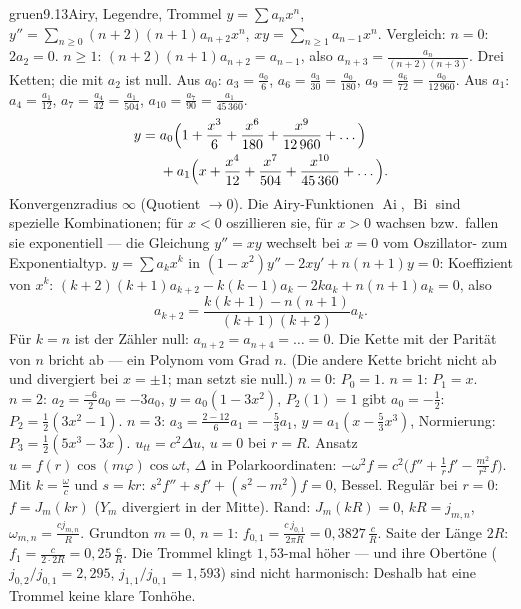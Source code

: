 \begin{loesungkarte}{gruen}{9.13}{Airy, Legendre, Trommel}
$y = \sum a_nx^{n}$, $y'' = \sum_{n\ge0}(n + 2)(n + 1)a_{n+2}x^{n}$, $xy = \sum_{n\ge1}a_{n-1}x^{n}$. Vergleich: $n = 0$: $2a_2 = 0$. $n\ge1$: $(n + 2)(n + 1)a_{n+2} = a_{n-1}$, also $a_{n+3} = \frac{a_n}{(n + 2)(n + 3)}$. Drei Ketten; die mit $a_2$ ist null. Aus $a_0$: $a_3 = \frac{a_0}6$, $a_6 = \frac{a_3}{30} = \frac{a_0}{180}$, $a_9 = \frac{a_6}{72} = \frac{a_0}{12\,960}$. Aus $a_1$: $a_4 = \frac{a_1}{12}$, $a_7 = \frac{a_4}{42} = \frac{a_1}{504}$, $a_{10} = \frac{a_7}{90} = \frac{a_1}{45\,360}$.
\begin{align*} y = {}& a_0\Bigl(1 + \frac{x^{3}}6 + \frac{x^{6}}{180} + \frac{x^{9}}{12\,960} + \dots\Bigr)\\ &+ a_1\Bigl(x + \frac{x^{4}}{12} + \frac{x^{7}}{504} + \frac{x^{10}}{45\,360} + \dots\Bigr). \end{align*}
Konvergenzradius $\infty$ (Quotient $\to0$). Die Airy-Funktionen $\operatorname{Ai}$, $\operatorname{Bi}$ sind spezielle Kombinationen; für $x < 0$ oszillieren sie, für $x > 0$ wachsen bzw.\ fallen sie exponentiell --- die Gleichung $y'' = xy$ wechselt bei $x = 0$ vom Oszillator- zum Exponentialtyp.
$y = \sum a_kx^{k}$ in $(1 - x^{2})y'' - 2xy' + n(n + 1)y = 0$: Koeffizient von $x^{k}$: $(k + 2)(k + 1)a_{k+2} - k(k - 1)a_k - 2ka_k + n(n + 1)a_k = 0$, also
\[ a_{k+2} = \frac{k(k + 1) - n(n + 1)}{(k + 1)(k + 2)}a_k. \]
Für $k = n$ ist der Zähler null: $a_{n+2} = a_{n+4} = \dots = 0$. Die Kette mit der Parität von $n$ bricht ab --- ein Polynom vom Grad $n$. (Die andere Kette bricht nicht ab und divergiert bei $x = \pm1$; man setzt sie null.) $n = 0$: $P_0 = 1$. $n = 1$: $P_1 = x$. $n = 2$: $a_2 = \frac{-6}2a_0 = -3a_0$, $y = a_0(1 - 3x^{2})$, $P_2(1) = 1$ gibt $a_0 = -\frac12$: $P_2 = \frac12(3x^{2} - 1)$. $n = 3$: $a_3 = \frac{2 - 12}6a_1 = -\frac53a_1$, $y = a_1(x - \frac53x^{3})$, Normierung: $P_3 = \frac12(5x^{3} - 3x)$.
$u_{tt} = c^{2}\Delta u$, $u = 0$ bei $r = R$. Ansatz $u = f(r)\cos(m\varphi)\cos\omega t$, $\Delta$ in Polarkoordinaten: $-\omega^{2}f = c^{2}\bigl(f'' + \frac1rf' - \frac{m^{2}}{r^{2}}f\bigr)$. Mit $k = \frac\omega c$ und $s = kr$: $s^{2}f'' + sf' + (s^{2} - m^{2})f = 0$, Bessel. Regulär bei $r = 0$: $f = J_m(kr)$ ($Y_m$ divergiert in der Mitte). Rand: $J_m(kR) = 0$, $kR = j_{m,n}$, $\omega_{m,n} = \frac{cj_{m,n}}R$. Grundton $m = 0$, $n = 1$: $f_{0,1} = \frac{c\,j_{0,1}}{2\pi R} = 0{,}3827\,\frac cR$. Saite der Länge $2R$: $f_1 = \frac c{2\cdot2R} = 0{,}25\,\frac cR$. Die Trommel klingt $1{,}53$-mal höher --- und ihre Obertöne ($j_{0,2}/j_{0,1} = 2{,}295$, $j_{1,1}/j_{0,1} = 1{,}593$) sind nicht harmonisch: Deshalb hat eine Trommel keine klare Tonhöhe.

\end{loesungkarte}
